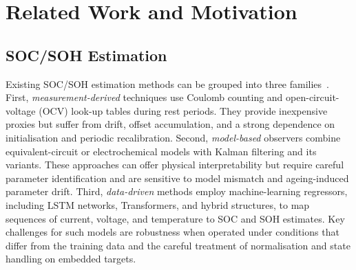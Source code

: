 \documentclass[review]{elsarticle}
\begin{document}
\section{Related Work and Motivation}
\subsection{SOC/SOH Estimation}
Existing SOC/SOH estimation methods can be grouped into three families~\cite{a.m.s.m.h.s.attanayakaEstimationStateCharge2019,berecibarCriticalReviewState2016,shrivastavaReviewTechnologicalAdvancement2023,guoSystematicReviewElectrochemical2024}. First, \emph{measurement-derived} techniques use Coulomb counting and open-circuit-voltage (OCV) look-up tables during rest periods. They provide inexpensive proxies but suffer from drift, offset accumulation, and a strong dependence on initialisation and periodic recalibration. Second, \emph{model-based} observers combine equivalent-circuit or electrochemical models with Kalman filtering and its variants. These approaches can offer physical interpretability but require careful parameter identification and are sensitive to model mismatch and ageing-induced parameter drift. Third, \emph{data-driven} methods employ machine-learning regressors, including LSTM networks, Transformers, and hybrid structures, to map sequences of current, voltage, and temperature to SOC and SOH estimates. Key challenges for such models are robustness when operated under conditions that differ from the training data and the careful treatment of normalisation and state handling on embedded targets.
\end{document}
